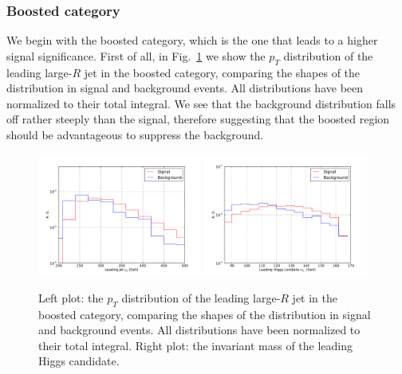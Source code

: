 \subsubsection{Boosted category}


We begin with the boosted category, which is the one that leads
to a higher signal significance.
%
First of all,
in Fig.~\ref{fig:cutplots1} we show
the $p_T$ distribution of the
  leading large-$R$ jet in the boosted category, comparing
  the shapes of the distribution in signal and background events.
  All distributions have been normalized to their total integral.
  We see that the background distribution
  falls off rather steeply than the signal, therefore
  suggesting that the boosted region should be
  advantageous to suppress the background.


\begin{figure}[t]
\begin{center}
  \includegraphics[width=0.48\textwidth]{plots/pt_H0_res_C1_boost.pdf}
  \includegraphics[width=0.48\textwidth]{plots/m_H0_res_C1_boost.pdf}
\caption{\small Left plot: the $p_T$ distribution of the
  leading large-$R$ jet in the boosted category, comparing
  the shapes of the distribution in signal and background events.
  All distributions have been normalized to their total integral.
  Right plot: the invariant mass of the leading Higgs
  candidate.
}
\label{fig:cutplots1}
\end{center}
\end{figure}

